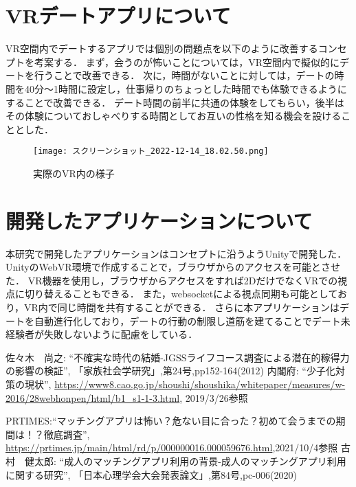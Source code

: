 \documentclass[twocolumn,10pt,a4j]{ltjsarticle}
\begin{document}
\section{VRデートアプリについて}
VR空間内でデートするアプリでは個別の問題点を以下のように改善するコンセプトを考案する．
まず，会うのが怖いことについては，VR空間内で擬似的にデートを行うことで改善できる．
次に，時間がないことに対しては，デートの時間を40分〜1時間に設定し，仕事帰りのちょっとした時間でも体験できるようにすることで改善できる．
デート時間の前半に共通の体験をしてもらい，後半はその体験についておしゃべりする時間としてお互いの性格を知る機会を設けることとした．
\begin{figure}[h]
\begin{center}
\texttt{[image: スクリーンショット\_2022-12-14\_18.02.50.png]}
\end{center}
 \caption{実際のVR内の様子}
\end{figure}

\section{開発したアプリケーションについて}
本研究で開発したアプリケーションはコンセプトに沿うようUnityで開発した．
UnityのWebVR環境で作成することで，ブラウザからのアクセスを可能とさせた．
VR機器を使用し，ブラウザからアクセスをすれば2DだけでなくVRでの視点に切り替えることもできる．
また，websocketによる視点同期も可能としており，VR内で同じ時間を共有することができる．
さらに本アプリケーションはデートを自動進行化しており，デートの行動の制限し道筋を建てることでデート未経験者が失敗しないように配慮をしている．


\begin{thebibliography}{99}
 佐々木　尚之: ``不確実な時代の結婚-JGSSライフコース調査による潜在的稼得力の影響の検証'', 「家族社会学研究」,第24号,pp152-164(2012)
 内閣府: ``少子化対策の現状'', \url{https://www8.cao.go.jp/shoushi/shoushika/whitepaper/measures/w-2016/28webhonpen/html/b1_s1-1-3.html}, 2019/3/26参照


PRTIMES:``マッチングアプリは怖い？危ない目に合った？初めて会うまでの期間は！？徹底調査'',
\url{https://prtimes.jp/main/html/rd/p/000000016.000059676.html},2021/10/4参照
 古村　健太郎: ``成人のマッチングアプリ利用の背景-成人のマッチングアプリ利用に関する研究'', 「日本心理学会大会発表論文」,第84号,pc-006(2020)

\end{thebibliography}
\end{document}
